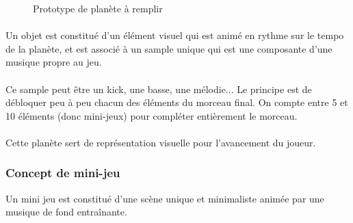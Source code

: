 \begin{figure}[H]\centering
  \caption{Prototype de planète à remplir}
  \label{protoPlanete}
\end{figure}

\paragraph{} Un objet est constitué d’un élément visuel qui est animé en rythme sur le tempo de la planète, et est associé à un sample unique qui est une composante d’une musique propre au jeu.\
\paragraph{}Ce sample peut être un kick, une basse, une mélodie... Le principe est de débloquer peu à peu chacun des éléments du morceau final. On compte entre 5 et 10 éléments (donc mini-jeux) pour compléter entièrement le morceau.
\paragraph{}Cette planète sert de représentation visuelle pour l’avancement du joueur.

\subsubsection{Concept de mini-jeu}
Un mini jeu est constitué d’une scène unique et minimaliste animée par une musique de fond entraînante.

